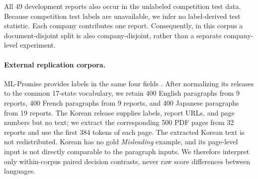 \begin{table}[t]
  \centering
  \small
  \caption{AI CUP 2026 dataset composition and hierarchy audit.}
  \label{tab:dataset}
  
\end{table}

All 49 development reports also occur in the unlabeled competition test data.
Because competition test labels are unavailable, we infer no label-derived
test statistic. Each company contributes one report.
Consequently, in this corpus a document-disjoint split is also
company-disjoint, rather than a separate company-level experiment.

\paragraph{External replication corpora.}
ML-Promise provides labels in the same four fields
\cite{seki2025mlpromise}. After normalizing its releases to the common
17-state vocabulary, we retain 400 English paragraphs from 9 reports, 400
French paragraphs from 9 reports, and 400 Japanese paragraphs from 19 reports.
The Korean release supplies labels, report URLs, and page numbers but no text;
we extract the corresponding 500 PDF pages from 32 reports and use the first
384 tokens of each page. The extracted Korean text is not redistributed.
Korean has no gold \emph{Misleading} example, and its page-level input is not
directly comparable to the paragraph inputs. We therefore interpret only
within-corpus paired decision contrasts, never raw score differences between
languages.
